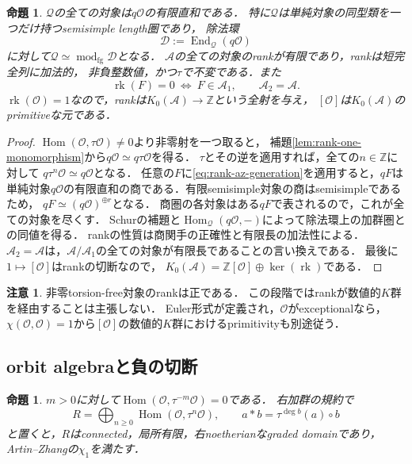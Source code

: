 \documentclass[11pt,a4paper]{ltjsarticle}
\newtheorem{proposition}[theorem]{命題}
\theoremstyle{definition}
\newtheorem{remark}[theorem]{注意}
\newcommand{\OO}{\mathcal O}
\renewcommand{\AA}{\mathcal A}
\newcommand{\Hom}{\operatorname{Hom}}
\newcommand{\End}{\operatorname{End}}
\newcommand{\rk}{\operatorname{rk}}
\begin{document}
\begin{proposition}\label{prop:generic-semisimple}
$\mathcal Q$の全ての対象は$q\OO$の有限直和である．
特に$\mathcal Q$は単純対象の同型類を一つだけ持つsemisimple length圏であり，
除法環
\[
 \mathcal D:=\End_{\mathcal Q}(q\OO)
\]
に対して$\mathcal Q\simeq\operatorname{mod}_{\mathrm{fg}}\mathcal D$となる．
$\AA$の全ての対象のrankが有限であり，rankは短完全列に加法的，
非負整数値，かつ$\tau$で不変である．また
\[
 \rk(F)=0\ \Longleftrightarrow\ F\in\AA_1,
 \qquad \AA_2=\AA.
\]
$\rk(\OO)=1$なので，rankは$K_0(\AA)\to\mathbb Z$という全射を与え，
$[\OO]$は$K_0(\AA)$のprimitiveな元である．
\end{proposition}

\begin{proof}
$\Hom(\OO,\tau\OO)\ne0$より非零射を一つ取ると，
補題\ref{lem:rank-one-monomorphism}から$q\OO\simeq q\tau\OO$を得る．
$\tau$とその逆を適用すれば，全ての$n\in\mathbb Z$に対して
$q\tau^n\OO\simeq q\OO$となる．
任意の$F$に\eqref{eq:rank-az-generation}を適用すると，$qF$は
単純対象$q\OO$の有限直和の商である．有限semisimple対象の商はsemisimpleであるため，
$qF\simeq(q\OO)^{\oplus r}$となる．
商圏の各対象はある$qF$で表されるので，これが全ての対象を尽くす．
Schurの補題と$\Hom_{\mathcal Q}(q\OO,-)$によって除法環上の加群圏との同値を得る．
rankの性質は商関手の正確性と有限長の加法性による．
$\AA_2=\AA$は，$\AA/\AA_1$の全ての対象が有限長であることの言い換えである．
最後に$1\mapsto[\OO]$はrankの切断なので，
$K_0(\AA)=\mathbb Z[\OO]\oplus\ker(\rk)$である．
\end{proof}

\begin{remark}
非零torsion-free対象のrankは正である．
この段階ではrankが数値的$K$群を経由することは主張しない．
Euler形式が定義され，$\OO$がexceptionalなら，
$\chi(\OO,\OO)=1$から$[\OO]$の数値的$K$群におけるprimitivityも別途従う．
\end{remark}

\subsection{orbit algebraと負の切断}

\begin{proposition}\label{prop:orbit-domain-negative}
$m>0$に対して$\Hom(\OO,\tau^{-m}\OO)=0$である．
右加群の規約で
\[
 R=\bigoplus_{n\geq0}\Hom(\OO,\tau^n\OO),\qquad
 a*b=\tau^{\deg b}(a)\circ b
\]
と置くと，$R$はconnected，局所有限，右noetherianなgraded domainであり，
Artin--Zhangの$\chi_1$を満たす．
\end{proposition}
\end{document}
